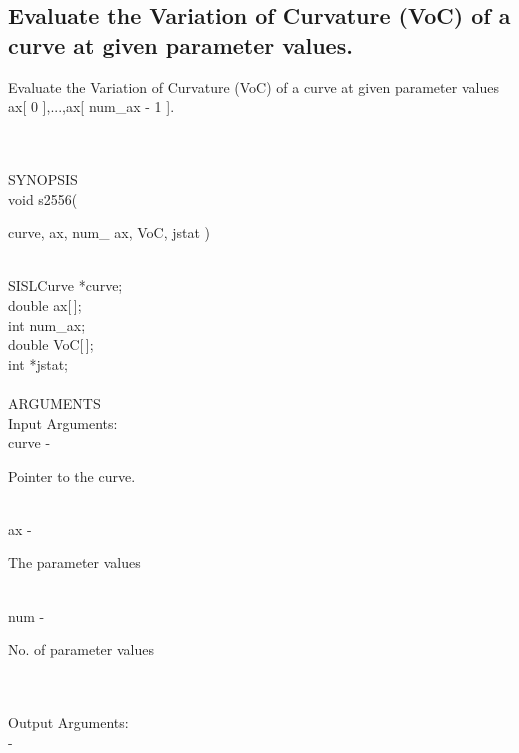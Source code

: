 \subsection{Evaluate the Variation of Curvature (VoC) of a curve at given parameter values.}
\begin{minipg1}
Evaluate the Variation of Curvature (VoC) of a curve
               at given parameter values ax[ 0 ],...,ax[ num\_ax - 1 ].
\end{minipg1} \\ \\
SYNOPSIS\\
        \> void s2556(\begin{minipg3}
             {\fov curve},  {\fov ax}, num\_ {\fov ax},  {\fov VoC}, jstat )
                \end{minipg3}\\
                \>\>    SISLCurve    \>  *{\fov curve};\\
                \>\>    double    \>  {\fov ax}[\,];\\
                \>\>    int    \>  {\fov num}\_ax;\\
                \>\>    double    \>  {\fov VoC}[\,];\\
                \>\>    int    \>  *{\fov jstat};\\
\\
ARGUMENTS\\
	\>Input Arguments:\\
        \>\>    {\fov curve}\> - \>  \begin{minipg2}
                     Pointer to the curve.
                               \end{minipg2}\\
        \>\>    {\fov ax}\> - \>  \begin{minipg2}
                     The parameter values
                               \end{minipg2}\\
        \>\>    {\fov num}\> - \>  \begin{minipg2}
                     No. of parameter values
                               \end{minipg2}\\
\\
	\>Output Arguments:\\
        \>\>    {\fov }\> - \>  \begin{minipg2}
             
                               \end{minipg2}\\
